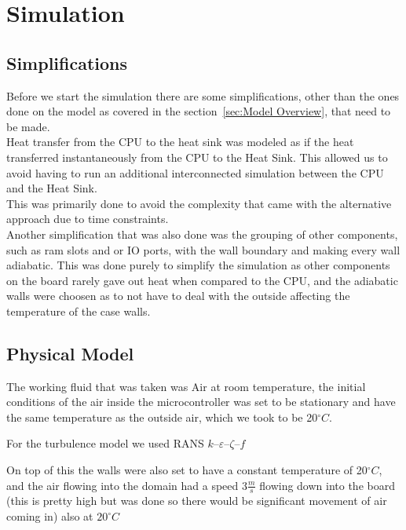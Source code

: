 \documentclass[a4paper, 10pt]{article}
\begin{document}
	\section{Simulation}
		\subsection{Simplifications}
			\noindent Before we start the simulation there are some simplifications, other than the ones done on the model as covered in the
			section~\ref{sec:Model Overview},  that need to be made. \\

			\noindent Heat transfer from the CPU to the heat sink was modeled as if the heat transferred instantaneously from the CPU to the Heat Sink.
			This allowed us to avoid having to run an additional interconnected simulation between the CPU and the Heat Sink. \\

			\noindent This was primarily done to avoid the complexity that came with the alternative approach due to time constraints. \\

			\noindent Another simplification that was also done was the grouping of other components, such as ram slots and or IO ports,
			with the wall boundary and making every wall adiabatic. This was done purely to simplify the simulation as other components
			on the board rarely gave out heat when compared to the CPU, and the adiabatic walls were choosen as to not have to deal with
			the outside affecting the temperature of the case walls.

		\subsection{Physical Model}
			\noindent The working fluid that was taken was Air at room temperature, the initial conditions of the air inside the microcontroller
			was set to be stationary and have the same temperature as the outside air, which we took to be 20$^\circ C$. \newline

			\noindent For the turbulence model we used RANS $k$--$\varepsilon$--$\zeta$--$f$ \newline

			\noindent On top of this the walls were also set to have a constant temperature of 20$^\circ C$, and the air flowing into the domain
			had a speed $3 \frac{m}{s}$ flowing down into the board (this is pretty high but was done so there would be significant movement of air coming in) also at $20^\circ C$ \newline
\end{document}
